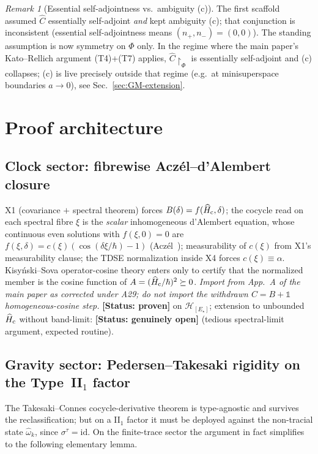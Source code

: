 \documentclass[11pt,a4paper]{article}
\theoremstyle{definition}
\theoremstyle{remark}
\newtheorem{remark}[theorem]{Remark}
\newcommand{\HH}{\mathcal{H}}
\newcommand{\id}{\mathbb{1}}
\newcommand{\tr}{\tau}
\newcommand{\PROVEN}{\textbf{[Status: proven]}}
\newcommand{\OPEN}{\textbf{[Status: genuinely open]}}
\begin{document}
\begin{remark}[Essential self-adjointness vs.\ ambiguity
(c)]\label{rem:esa-vs-c}
The first scaffold assumed $\widehat C$ essentially
self-adjoint \emph{and} kept ambiguity (c); that conjunction is
inconsistent (essential self-adjointness means
$(n_+,n_-)=(0,0)$). The standing assumption is now symmetry on
$\Phi$ only. In the regime where the main paper's Kato--Rellich
argument (T4)+(T7) applies, $\widehat C\!\restriction_\Phi$ is
essentially self-adjoint and (c) collapses; (c) is live
precisely outside that regime (e.g.\ at minisuperspace
boundaries $a\to0$), see Sec.~\ref{sec:GM-extension}.
\end{remark}

\section{Proof architecture}
\label{sec:proof}

\subsection{Clock sector: fibrewise Acz\'el--d'Alembert
closure}\label{sec:proof-clock}

X1 (covariance $+$ spectral theorem) forces
$B(\delta)=f(\widehat H_{\rm c},\delta)$; the cocycle read on
each spectral fibre $\xi$ is the \emph{scalar} inhomogeneous
d'Alembert equation, whose continuous even solutions with
$f(\xi,0)=0$ are $f(\xi,\delta)=c(\xi)(\cos(\delta\xi/\hbar)-1)$
(Acz\'el~\cite{Aczel1966}); measurability of $c(\xi)$ from X1's
measurability clause; the TDSE normalization inside X4 forces
$c(\xi)\equiv\alpha$. Kisy\'nski--Sova operator-cosine theory
\cite{Kisynski1972,Sova1966} enters only to certify that the
normalized member is the cosine function of
$A=(\widehat H_{\rm c}/\hbar)^2\succeq0$.
\emph{Import from App.~A of the main paper as corrected under
A29; do not import the withdrawn $C=B+\id$ homogeneous-cosine
step.} \PROVEN{} on $\HH_{[E_\star]}$;
extension to unbounded $\widehat H_{\rm c}$ without band-limit:
\OPEN{} (tedious spectral-limit argument, expected routine).

\subsection{Gravity sector: Pedersen--Takesaki rigidity on the
Type~II$_1$ factor}\label{sec:proof-gravity}

The Takesaki--Connes cocycle-derivative theorem
\cite[Thm.~VIII.3.3]{Takesaki2003} is type-agnostic and
survives the reclassification; but on a II$_1$ factor it must
be deployed against the non-tracial state $\hat\omega_k$, since
$\sigma^{\tr}=\mathrm{id}$. On the finite-trace sector the
argument in fact simplifies to the following elementary lemma.
\end{document}
